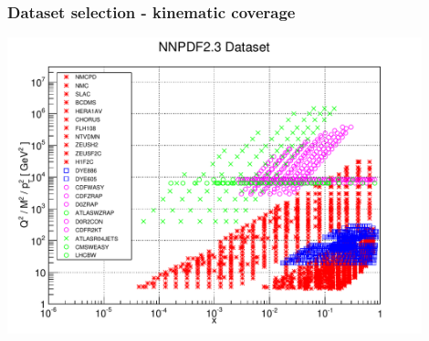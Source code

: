 \documentclass[10pt]{beamer}
\begin{document}
\begin{frame}
\frametitle{Dataset selection - kinematic coverage}
\begin{center}
\includegraphics[width=0.9\textwidth]{figures/23kin.pdf}
\end{center}
\end{frame}
\end{document}
